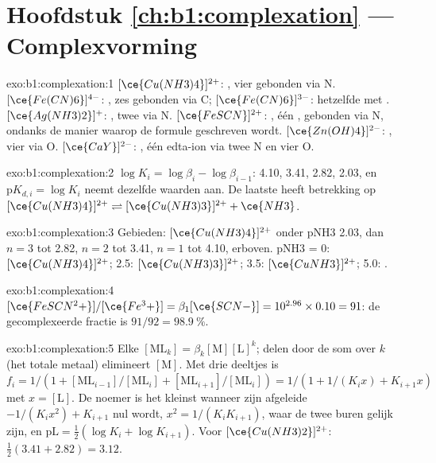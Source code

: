 \section*{Hoofdstuk \ref{ch:b1:complexation} --- Complexvorming}

\begin{solution}{exo:b1:complexation:1}
$[\ce{Cu(NH3)4}]^{2+}$: , vier  gebonden via N.
$[\ce{Fe(CN)6}]^{4-}$: , zes  gebonden via C;
$[\ce{Fe(CN)6}]^{3-}$: hetzelfde met . $[\ce{Ag(NH3)2}]^{+}$:
, twee  via N. $[\ce{FeSCN}]^{2+}$: , één
, gebonden via N, ondanks de manier waarop de formule geschreven
wordt. $[\ce{Zn(OH)4}]^{2-}$: , vier  via O.
$[\ce{CaY}]^{2-}$: , één edta-ion via twee N en vier O.
\end{solution}

\begin{solution}{exo:b1:complexation:2}
$\log K_i = \log\beta_i - \log\beta_{i-1}$: 4.10, 3.41, 2.82, 2.03, en
$\mathrm{p}K_{d,i} = \log K_i$ neemt dezelfde waarden aan. De laatste
heeft betrekking op
$[\ce{Cu(NH3)4}]^{2+} \rightleftharpoons [\ce{Cu(NH3)3}]^{2+} + \ce{NH3}$.
\end{solution}

\begin{solution}{exo:b1:complexation:3}
Gebieden: $[\ce{Cu(NH3)4}]^{2+}$ onder pNH3 2.03, dan $n = 3$ tot 2.82,
$n = 2$ tot 3.41, $n = 1$ tot 4.10,  erboven. pNH3 = 0:
$[\ce{Cu(NH3)4}]^{2+}$; 2.5: $[\ce{Cu(NH3)3}]^{2+}$; 3.5:
$[\ce{CuNH3}]^{2+}$; 5.0: .
\end{solution}

\begin{solution}{exo:b1:complexation:4}
$[\ce{FeSCN^2+}]/[\ce{Fe^3+}] = \beta_1[\ce{SCN-}] = 10^{2.96} \times 0.10 =
91$: de gecomplexeerde fractie is $91/92 = \qty{98.9}{\percent}$.
\end{solution}

\begin{solution}{exo:b1:complexation:5}
Elke $[\mathrm{ML}_k] = \beta_k[\mathrm{M}][\mathrm{L}]^k$; delen door de
som over $k$ (het totale metaal) elimineert $[\mathrm{M}]$. Met drie
deeltjes is $f_i = 1/(1 + [\mathrm{ML}_{i-1}]/[\mathrm{ML}_i] +
[\mathrm{ML}_{i+1}]/[\mathrm{ML}_i]) = 1/(1 + 1/(K_i x) + K_{i+1}x)$ met
$x = [\mathrm{L}]$. De noemer is het kleinst wanneer zijn afgeleide
$-1/(K_i x^2) + K_{i+1}$ nul wordt, $x^2 = 1/(K_iK_{i+1})$, waar de twee
buren gelijk zijn, en $\mathrm{pL} = \frac12(\log K_i + \log K_{i+1})$.
Voor $[\ce{Cu(NH3)2}]^{2+}$: $\frac12(3.41 + 2.82) = 3.12$.
\end{solution}


